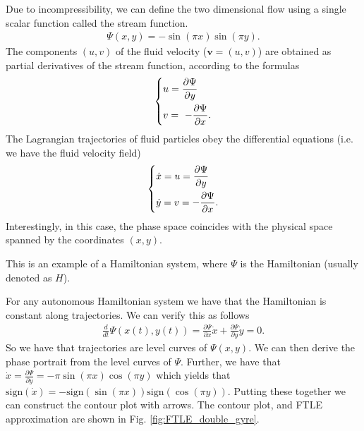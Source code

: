 \begin{ex}
	Due to incompressibility, we can define the two dimensional flow using a single scalar function called the stream function.
\begin{align}
	\Psi(x,y) = -\sin(\pi x) \sin(\pi y).
\end{align}
	The components $(u,v)$ of the fluid velocity ($\bm{v} = (u,v)$) are obtained as partial derivatives of the stream function, according to the formulas
	\begin{align}
		\begin{dcases}
			u = \frac{\partial \Psi}{\partial y} \\ 
			v = \ - \frac{\partial \Psi}{\partial x}.
		\end{dcases}
	\end{align}
The Lagrangian trajectories of fluid particles obey the differential equations (i.e. we have the fluid velocity field)
\begin{align} 
	\begin{dcases}
		\dot{x} = u =  \frac{\partial \Psi}{\partial y} \\
		\dot{y} = v = - \frac{\partial \Psi}{\partial x}.
	\end{dcases}
\end{align}
Interestingly, in this case, the phase space coincides with the physical space spanned by the coordinates $(x,y)$.
\begin{remark}[]
	This is an example of a Hamiltonian system, where $\Psi$ is the Hamiltonian (usually denoted as $H$).
\end{remark}
For any autonomous Hamiltonian system we have that the Hamiltonian is constant along trajectories. We can verify this as follows
\begin{align}
	\frac{d}{dt}\Psi(x(t),y(t)) = \frac{\partial \Psi}{\partial x}\dot{x} + \frac{\partial \Psi}{\partial y}\dot{y} = 0.
\end{align}
So we have that trajectories are level curves of $\Psi(x,y)$. We can then derive the phase portrait from the level curves of $\Psi$. Further, we have that $\dot{x} = \frac{\partial \Psi}{\partial y} = - \pi \sin(\pi x) \cos(\pi y)$ which yields that $ \textrm{sign} (\dot{x}) = -  \textrm{sign} (\sin(\pi x))  \textrm{sign} (\cos(\pi y))$. Putting these together we can construct the contour plot with arrows. The contour plot, and FTLE approximation are shown in Fig. \ref{fig:FTLE_double_gyre}.


\end{ex}
